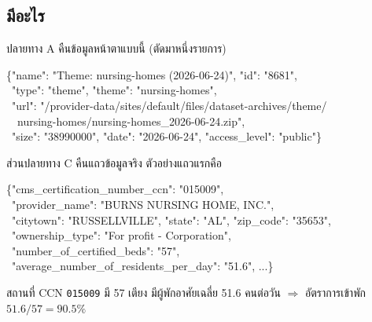 \documentclass[11pt,a4paper]{article}
\newcommand{\code}[1]{\texttt{#1}}
\begin{document}
\subsection{มีอะไร}
ปลายทาง A คืนข้อมูลหน้าตาแบบนี้ (ตัดมาหนึ่งรายการ)

\begin{tcolorbox}[colback=wash, colframe=rule, boxrule=0.5pt, arc=1pt,
                  left=6pt, right=6pt, top=4pt, bottom=4pt]
\ttfamily\scriptsize
\{"name": "Theme: nursing-homes (2026-06-24)", "id": "8681",\\
\ "type": "theme", "theme": "nursing-homes",\\
\ "url": "/provider-data/sites/default/files/dataset-archives/theme/\\
\ \ nursing-homes/nursing-homes\_2026-06-24.zip",\\
\ "size": "38990000", "date": "2026-06-24", "access\_level": "public"\}
\end{tcolorbox}

ส่วนปลายทาง C คืนแถวข้อมูลจริง ตัวอย่างแถวแรกคือ

\begin{tcolorbox}[colback=wash, colframe=rule, boxrule=0.5pt, arc=1pt,
                  left=6pt, right=6pt, top=4pt, bottom=4pt]
\ttfamily\scriptsize
\{"cms\_certification\_number\_ccn": "015009",\\
\ "provider\_name": "BURNS NURSING HOME, INC.",\\
\ "citytown": "RUSSELLVILLE", "state": "AL", "zip\_code": "35653",\\
\ "ownership\_type": "For profit - Corporation",\\
\ "number\_of\_certified\_beds": "57",\\
\ "average\_number\_of\_residents\_per\_day": "51.6", ...\}
\end{tcolorbox}

\begin{goodbox}[title={แถวตัวอย่างนี้เรียกมาจริงแล้ว และใช้เป็นกรณีทดสอบได้}]
สถานที่ CCN \code{015009} มี 57 เตียง มีผู้พักอาศัยเฉลี่ย 51.6 คนต่อวัน
$\Rightarrow$ อัตราการเข้าพัก $51.6/57 = \mathbf{90.5\%}$
\end{goodbox}
\end{document}
